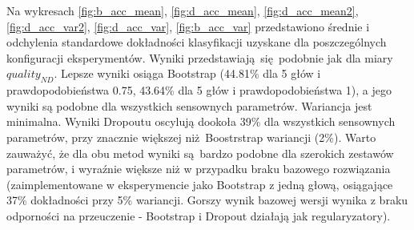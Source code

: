 Na wykresach \ref{fig:b_acc_mean}, \ref{fig:d_acc_mean}, \ref{fig:d_acc_mean2}, \ref{fig:d_acc_var2}, \ref{fig:d_acc_var}, \ref{fig:b_acc_var} przedstawiono średnie i odchylenia standardowe dokładności klasyfikacji uzyskane dla poszczególnych konfiguracji eksperymentów. Wyniki przedstawiają się podobnie jak dla miary $quality_{ND}$. Lepsze wyniki osiąga Bootstrap (44.81\% dla 5 głów i prawdopodobieństwa 0.75, 43.64\%  dla 5 głów i prawdopodobieństwa 1), a jego wyniki są podobne dla wszystkich sensownych parametrów. Wariancja jest minimalna. Wyniki Dropoutu oscylują dookoła 39\% dla wszystkich sensownych parametrów, przy znacznie większej niż Boostrstrap wariancji (2\%). Warto zauważyć, że dla obu metod wyniki są bardzo podobne dla szerokich zestawów parametrów, i wyraźnie większe niż w przypadku braku bazowego rozwiązania (zaimplementowane w eksperymencie jako Bootstrap z jedną głową, osiągające 37\% dokładności przy 5\% wariancji. Gorszy wynik bazowej wersji wynika z braku odporności na przeuczenie - Bootstrap i Dropout działają jak regularyzatory).


